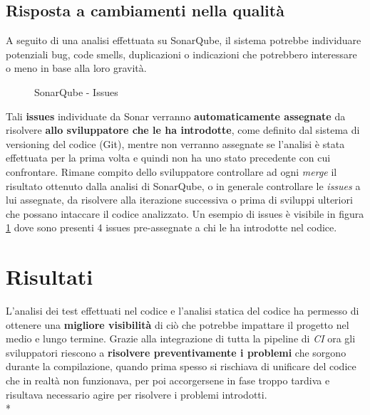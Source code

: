 \documentclass[../main.tex]{subfiles}
\begin{document}
        	\subsection{Risposta a cambiamenti nella qualità}
        	
        	    A seguito di una analisi effettuata su SonarQube, il sistema potrebbe individuare potenziali bug, code smells, duplicazioni o indicazioni che potrebbero interessare o meno in base alla loro gravità.
        	    
        	    \begin{figure}[H]
        			\centering
        			\caption{SonarQube - Issues}
        			\label{fig:sonar_issues}
    	        \end{figure}
    	        
    	        Tali \textbf{issues} individuate da Sonar verranno \textbf{automaticamente assegnate} da risolvere \textbf{allo sviluppatore che le ha introdotte}, come definito dal sistema di versioning del codice (Git), mentre non verranno assegnate se l'analisi è stata effettuata per la prima volta e quindi non ha uno stato precedente con cui confrontare. Rimane compito dello sviluppatore controllare ad ogni \emph{merge} il risultato ottenuto dalla analisi di SonarQube, o in generale controllare le \emph{issues} a lui assegnate, da risolvere alla iterazione successiva o prima di sviluppi ulteriori che possano intaccare il codice analizzato. Un esempio di issues è visibile in figura \ref{fig:sonar_issues} dove sono presenti 4 issues pre-assegnate a chi le ha introdotte nel codice.
    	
    	\section{Risultati}
    	
    	    L'analisi dei test effettuati nel codice e l'analisi statica del codice ha permesso di ottenere una \textbf{migliore visibilità} di ciò che potrebbe impattare il progetto nel medio e lungo termine. Grazie alla integrazione di tutta la pipeline di \emph{CI} ora gli sviluppatori riescono a \textbf{risolvere preventivamente i problemi} che sorgono durante la compilazione, quando prima spesso si rischiava di unificare del codice che in realtà non funzionava, per poi accorgersene in fase troppo tardiva e risultava necessario agire per risolvere i problemi introdotti.\\*
    	    
\end{document}
